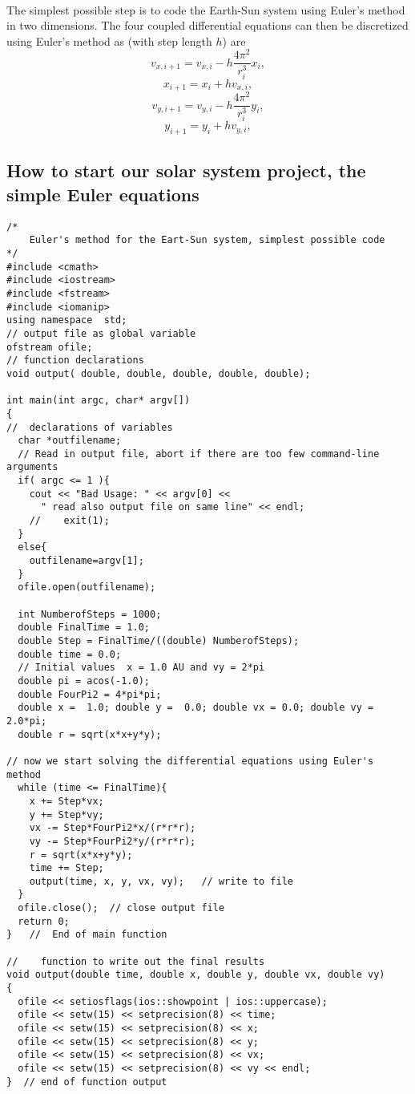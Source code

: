 \documentclass[%
oneside,                 %
final,                   %
10pt]{article}
\begin{document}
\paragraph{}

The simplest possible step is to code the Earth-Sun system using Euler's method in two dimensions.
The four coupled differential equations can then be discretized using Euler's method as (with step length $h$) are
\[
   v_{x,i+1}=v_{x,i}-h\frac{4\pi^2}{r_i^3}x_i,
\]
\[
   x_{i+1}=x_i+hv_{x,i},
\]
\[
   v_{y,i+1}=v_{y,i}-h\frac{4\pi^2}{r_i^3}y_i,
\]
\[
   y_{i+1}=y_i+hv_{y,i},
\]




\subsection*{How to start our solar system project, the simple Euler equations}
\begin{verbatim}
/*    
    Euler's method for the Eart-Sun system, simplest possible code
*/ 
#include <cmath>
#include <iostream>
#include <fstream>
#include <iomanip>
using namespace  std;
// output file as global variable
ofstream ofile;
// function declarations
void output( double, double, double, double, double);

int main(int argc, char* argv[])
{
//  declarations of variables
  char *outfilename;
  // Read in output file, abort if there are too few command-line arguments
  if( argc <= 1 ){
    cout << "Bad Usage: " << argv[0] <<
      " read also output file on same line" << endl;
    //    exit(1);
  }
  else{
    outfilename=argv[1];
  }
  ofile.open(outfilename);

  int NumberofSteps = 1000;
  double FinalTime = 1.0;
  double Step = FinalTime/((double) NumberofSteps);
  double time = 0.0;
  // Initial values  x = 1.0 AU and vy = 2*pi
  double pi = acos(-1.0);
  double FourPi2 = 4*pi*pi;
  double x =  1.0; double y =  0.0; double vx = 0.0; double vy = 2.0*pi;
  double r = sqrt(x*x+y*y);

// now we start solving the differential equations using Euler's method
  while (time <= FinalTime){
    x += Step*vx;
    y += Step*vy;
    vx -= Step*FourPi2*x/(r*r*r);
    vy -= Step*FourPi2*y/(r*r*r);
    r = sqrt(x*x+y*y);
    time += Step;
    output(time, x, y, vx, vy);   // write to file 
  }
  ofile.close();  // close output file
  return 0;
}   //  End of main function 

//    function to write out the final results
void output(double time, double x, double y, double vx, double vy)
{
  ofile << setiosflags(ios::showpoint | ios::uppercase);
  ofile << setw(15) << setprecision(8) << time;
  ofile << setw(15) << setprecision(8) << x;
  ofile << setw(15) << setprecision(8) << y;
  ofile << setw(15) << setprecision(8) << vx;
  ofile << setw(15) << setprecision(8) << vy << endl;
}  // end of function output


\end{verbatim}
\end{document}
